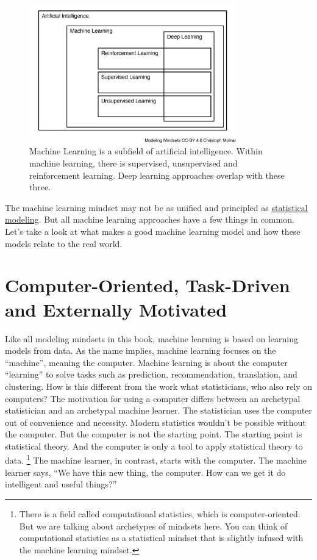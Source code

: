 \documentclass[
  10pt,
]{scrbook}
\begin{document}
\begin{figure}

{\centering \includegraphics[width=0.8\textwidth]{figures/ml-venn-1} 

}

\caption{Machine Learning is a subfield of artificial intelligence. Within machine learning, there is supervised, unsupervised and reinforcement learning. Deep learning approaches overlap with these three.}\label{fig:ml-venn}
\end{figure}

The machine learning mindset may not be as unified and principled as \protect\hyperlink{statistical-modeling}{statistical modeling}.
But all machine learning approaches have a few things in common.
Let's take a look at what makes a good machine learning model and how these models relate to the real world.

\hypertarget{computer-oriented-task-driven-and-externally-motivated}{%
\section{Computer-Oriented, Task-Driven and Externally Motivated}\label{computer-oriented-task-driven-and-externally-motivated}}

Like all modeling mindsets in this book, machine learning is based on learning models from data.
As the name implies, machine learning focuses on the ``machine'', meaning the computer.
Machine learning is about the computer ``learning'' to solve tasks such as prediction, recommendation, translation, and clustering.
How is this different from the work what statisticians, who also rely on computers?
The motivation for using a computer differs between an archetypal statistician and an archetypal machine learner.
The statistician uses the computer out of convenience and necessity.
Modern statistics wouldn't be possible without the computer.
But the computer is not the starting point.
The starting point is statistical theory.
And the computer is only a tool to apply statistical theory to data. \footnote{There is a field called computational statistics, which is computer-oriented. But we are talking about archetypes of mindsets here. You can think of computational statistics as a statistical mindset that is slightly infused with the machine learning mindset.}
The machine learner, in contrast, starts with the computer.
The machine learner says, ``We have this new thing, the computer. How can we get it do intelligent and useful things?''
\end{document}
